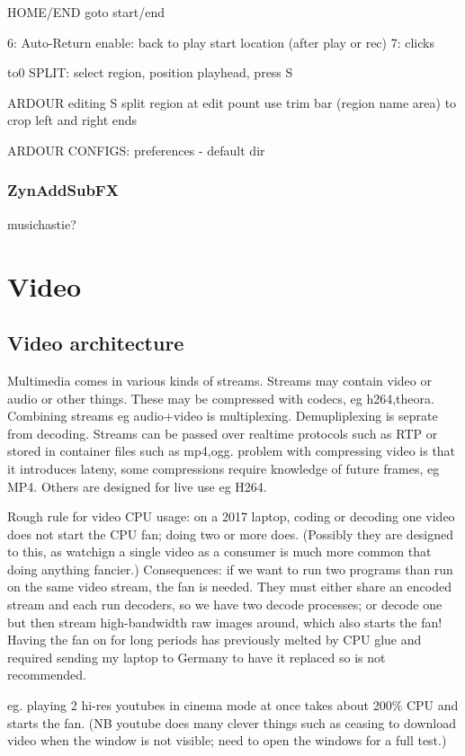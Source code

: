\documentclass[oneside,english]{scrbook}
\begin{document}
HOME/END goto start/end

6: Auto-Return enable: back to play start location (after play or rec)
7: clicks

to0 SPLIT: select region, position playhead, press S


ARDOUR editing
	S split region at edit pount
	use trim bar (region name area) to crop left and right ends

ARDOUR CONFIGS:
	preferences - default dir

\section{ZynAddSubFX}

musichastie?


\part{Video}


\chapter{Video architecture}

Multimedia comes in various kinds of streams. Streams may contain
video or audio or other things. These may be compressed with codecs,
eg h264,theora. Combining streams eg audio+video is multiplexing.
Demupliplexing is seprate from decoding. Streams can be passed over
realtime protocols such as RTP or stored in container files such as
mp4,ogg. problem with compressing video is that it introduces lateny,
some compressions require knowledge of future frames, eg MP4. Others
are designed for live use eg H264. 

Rough rule for video CPU usage: on a 2017 laptop, coding or decoding one video does not start the CPU fan; doing two or more does. (Possibly they are designed to this, as watchign a single video as a consumer is much more common that doing anything fancier.)  Consequences: if we want to run two programs than run on the same video stream, the fan is needed. They must either share an encoded stream and each run decoders, so we have two decode processes; or decode one but then stream high-bandwidth raw images around, which also starts the fan! Having the fan on for long periods has previously melted by CPU glue and required sending my laptop to Germany to have it replaced so is not recommended.

eg. playing 2 hi-res youtubes in cinema mode at once takes about 200\% CPU and starts the fan. (NB youtube does many clever things such as ceasing to download video when the window is not visible; need to open the windows for a full test.)
\end{document}
